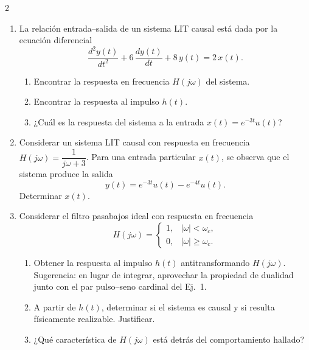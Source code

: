 \documentclass[10pt,a4paper]{article}
\begin{document}
\begin{multicols}{2}
\begin{enumerate}
			\item La relación entrada--salida de un sistema LIT causal está dada por la ecuación diferencial
			\[
				\frac{d^2 y(t)}{dt^2} + 6\,\frac{d y(t)}{dt} + 8\,y(t) = 2\,x(t).
			\]
			\begin{enumerate}
				\item Encontrar la respuesta en frecuencia $H(j\omega)$ del sistema.
				\item Encontrar la respuesta al impulso $h(t)$.
				\item ¿Cuál es la respuesta del sistema a la entrada $x(t) = e^{-3t}u(t)$?
			\end{enumerate}

			\item Considerar un sistema LIT causal con respuesta en frecuencia $H(j\omega) = \dfrac{1}{j\omega + 3}$. Para una entrada particular $x(t)$, se observa que el sistema produce la salida
			\[
				y(t) = e^{-3t}u(t) - e^{-4t}u(t).
			\]
			Determinar $x(t)$.

			\item Considerar el filtro pasabajos ideal con respuesta en frecuencia
			\[
				H(j\omega) =
				\begin{cases}
					1, & |\omega| < \omega_c, \\
					0, & |\omega| \geq \omega_c.
				\end{cases}
			\]
			\begin{enumerate}
				\item Obtener la respuesta al impulso $h(t)$ antitransformando $H(j\omega)$. Sugerencia: en lugar de integrar, aprovechar la propiedad de dualidad junto con el par pulso--seno cardinal del Ej.~1.
				\item A partir de $h(t)$, determinar si el sistema es causal y si resulta físicamente realizable. Justificar.
				\item ¿Qué característica de $H(j\omega)$ está detrás del comportamiento hallado?
			\end{enumerate}


\end{enumerate}
\end{multicols}
\end{document}
